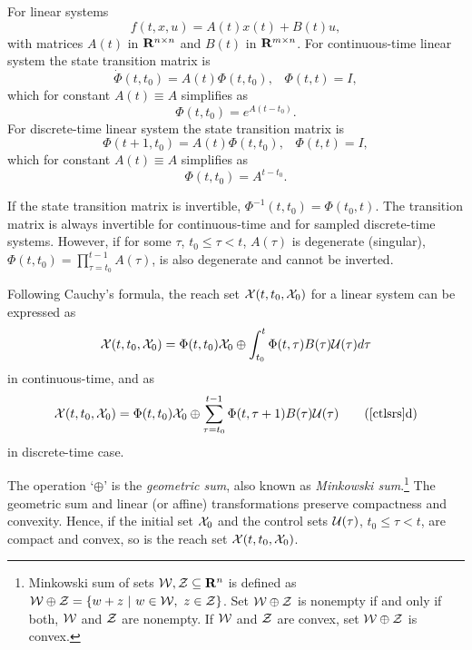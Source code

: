 For linear systems
\begin{equation}
f(t, x, u) = A(t)x(t) + B(t)u,
\label{linearrhs}
\end{equation}
with matrices $A(t)$ in ${\bf R}^{n\times n}$ and $B(t)$ in ${\bf R}^{m\times n}$.
For continuous-time linear system the state transition matrix is
\[ \dot{\Phi}(t, t_0) = A(t)\Phi(t, t_0), \;\;\; \Phi(t, t) = I, \]
which for constant $A(t)\equiv A$ simplifies as
\[ \Phi(t, t_0) = e^{A(t-t_0)} .\]
For discrete-time linear system the state transition matrix is
\[ \Phi(t+1, t_0) = A(t)\Phi(t, t_0), \;\;\; \Phi(t, t) = I, \]
which for constant $A(t)\equiv A$ simplifies as
\[ \Phi(t, t_0) = A^{t-t_0} .\]

If the state transition matrix is invertible, $\Phi^{-1}(t, t_0) = \Phi(t_0, t)$.
The transition matrix is always invertible for continuous-time and for sampled discrete-time systems.
However, if for some $\tau$, $t_0\leq\tau<t$, $A(\tau)$
is degenerate (singular),  $\Phi(t, t_0)=\prod_{\tau=t_0}^{t-1}A(\tau)$, is also degenerate
and  cannot be inverted.

Following Cauchy's formula,
the reach set $\XX(t, t_0, \XX_0)$ for a linear system can be expressed as
\begin{equation}
\XX(t, t_0, \XX_0) =
\Phi(t, t_0)\XX_0 \oplus \int_{t_0}^t\Phi(t, \tau)B(\tau)\UU(\tau)d\tau
\label{ctlsrs}
\end{equation}
in continuous-time, and as
\begin{equation}
\XX(t, t_0, \XX_0) =
\Phi(t, t_0)\XX_0 \oplus \sum_{\tau=t_0}^{t-1}\Phi(t, \tau+1)B(\tau)\UU(\tau)
\tag*{(\ref{ctlsrs}d)}
\label{dtlsrs}
\end{equation}
in discrete-time case.

The operation `$\oplus$' is the \emph{geometric sum},
also known as \emph{Minkowski sum}.\footnote{Minkowski sum of sets
$\WW, \ZZ \subseteq {\bf R}^n$ is defined as
$\WW \oplus \ZZ = \{w+z ~|~ w\in\WW, ~ z\in\ZZ\}$.
Set $\WW\oplus\ZZ$ is nonempty if and only if both, $\WW$ and $\ZZ$ are
nonempty.
If $\WW$ and $\ZZ$ are convex, set $\WW\oplus\ZZ$ is convex.}
The geometric sum and linear (or affine)
transformations preserve compactness and convexity.
Hence, if the initial set $\XX_0$ and the control sets $\UU(\tau)$,
$t_0\leq\tau<t$, are compact and convex, so is the reach set
$\XX(t, t_0, \XX_0)$.

